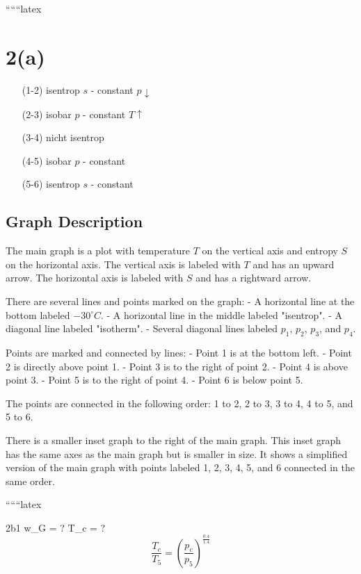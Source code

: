 
``````latex


\section*{2(a)}

\begin{itemize}
    \item[(1-2)] isentrop \quad $s$ - constant \quad $p \downarrow$
    \item[(2-3)] isobar \quad $p$ - constant \quad $T \uparrow$
    \item[(3-4)] nicht isentrop
    \item[(4-5)] isobar \quad $p$ - constant
    \item[(5-6)] isentrop \quad $s$ - constant
\end{itemize}

\subsection*{Graph Description}

The main graph is a plot with temperature $T$ on the vertical axis and entropy $S$ on the horizontal axis. The vertical axis is labeled with $T$ and has an upward arrow. The horizontal axis is labeled with $S$ and has a rightward arrow. 

There are several lines and points marked on the graph:
- A horizontal line at the bottom labeled $-30^\circ C$.
- A horizontal line in the middle labeled "isentrop".
- A diagonal line labeled "isotherm".
- Several diagonal lines labeled $p_1$, $p_2$, $p_3$, and $p_4$.

Points are marked and connected by lines:
- Point 1 is at the bottom left.
- Point 2 is directly above point 1.
- Point 3 is to the right of point 2.
- Point 4 is above point 3.
- Point 5 is to the right of point 4.
- Point 6 is below point 5.

The points are connected in the following order: 1 to 2, 2 to 3, 3 to 4, 4 to 5, and 5 to 6.

There is a smaller inset graph to the right of the main graph. This inset graph has the same axes as the main graph but is smaller in size. It shows a simplified version of the main graph with points labeled 1, 2, 3, 4, 5, and 6 connected in the same order.

``````latex

2b1 \quad w_G = ? \quad T_c = ? \\

\[
\frac{T_c}{T_5} = \left( \frac{p_c}{p_5} \right)^{\frac{0.4}{1.4}}
\]

